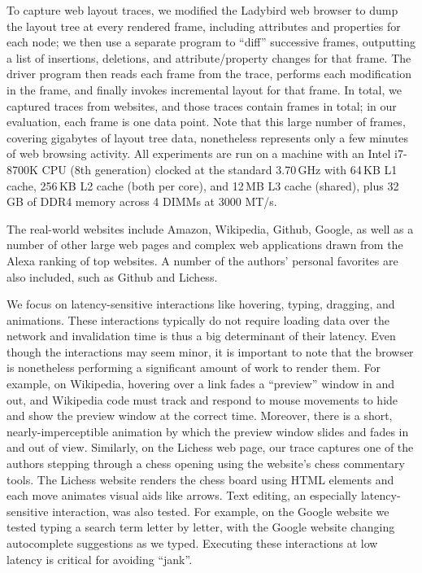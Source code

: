 To capture web layout traces,
  we modified the Ladybird web browser
  to dump the layout tree at every rendered frame,
  including attributes and properties for each node;
  we then use a separate program to ``diff'' successive frames,
  outputting a list of insertions, deletions,
  and attribute/property changes for that frame.
The driver program then reads each frame from the trace,
  performs each modification in the frame,
  and finally invokes incremental layout for that frame.
In total, we captured traces from \NumWebsites websites,
  and those traces contain  \NumFrames frames in total;
  in our evaluation, each frame is one data point.
Note that this large number of frames,
  covering gigabytes of layout tree data,
  nonetheless represents only a few minutes of web browsing activity.
All experiments are run on a machine with
  an Intel i7-8700K CPU (8th generation)
  clocked at the standard 3.70\,GHz
  with 64\,KB L1 cache, 256\,KB L2 cache (both per core),
  and 12\,MB L3 cache (shared), plus
  32\,GB of DDR4 memory across 4 DIMMs at 3000 MT/s.

The \NumWebsites real-world websites include
  Amazon, Wikipedia, Github, Google,
  as well as a number of other
  large web pages and complex web applications
  drawn from the Alexa ranking of top websites.
A number of the authors' personal favorites are also included,
  such as Github and Lichess.

We focus on latency-sensitive interactions
  like hovering, typing, dragging, and animations.
These interactions typically
  do not require loading data over the network
  and invalidation time is thus a big determinant of their latency.
Even though the interactions may seem minor,
  it is important to note that the browser is nonetheless
  performing a significant amount of work to render them.
For example, on Wikipedia, hovering over a link
  fades a ``preview'' window in and out,
  and Wikipedia code must track and respond to mouse movements
  to hide and show the preview window at the correct time.
Moreover, there is a short, nearly-imperceptible animation
  by which the preview window slides and fades in and out of view.
Similarly, on the Lichess web page,
  our trace captures one of the authors
  stepping through a chess opening using the website's
  chess commentary tools.
The Lichess website renders the chess board using HTML elements
  and each move animates visual aids like arrows.
Text editing, an especially latency-sensitive interaction,
  was also tested.
For example, on the Google website we tested
  typing a search term letter by letter,
  with the Google website changing autocomplete suggestions
  as we typed.
Executing these interactions at low latency
  is critical for avoiding ``jank''.


